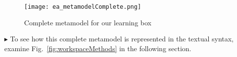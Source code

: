 \begin{enumerate}
\begin{figure}[htbp]
	\centering
  \texttt{[image: ea\_metamodelComplete.png]}
\caption[Complete metamodel for our learning box.]{Complete metamodel for our learning box}
	\label{fig:metamodel_complete}
\end{figure}

\item[$\blacktriangleright$] To see how this complete metamodel is represented in the textual syntax, examine Fig.~\ref{fig:workspaceMethods} in the following
section. 

\end{enumerate}

